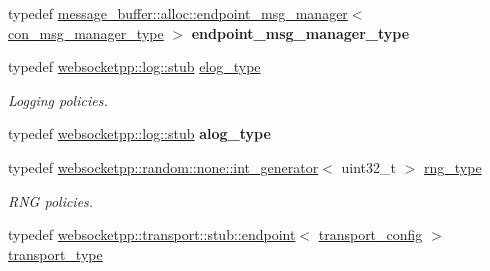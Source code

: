 \begin{DoxyCompactItemize}
\item 
typedef \hyperlink{classwebsocketpp_1_1message__buffer_1_1alloc_1_1endpoint__msg__manager}{message\+\_\+buffer\+::alloc\+::endpoint\+\_\+msg\+\_\+manager}$<$ \hyperlink{classwebsocketpp_1_1message__buffer_1_1alloc_1_1con__msg__manager}{con\+\_\+msg\+\_\+manager\+\_\+type} $>$ {\bfseries endpoint\+\_\+msg\+\_\+manager\+\_\+type}\hypertarget{structwebsocketpp_1_1config_1_1minimal__server_aeb6079297c7d7ceb1742178e00d11b34}{}\label{structwebsocketpp_1_1config_1_1minimal__server_aeb6079297c7d7ceb1742178e00d11b34}

\item 
typedef \hyperlink{classwebsocketpp_1_1log_1_1stub}{websocketpp\+::log\+::stub} \hyperlink{structwebsocketpp_1_1config_1_1minimal__server_ab8a516661fb2ddd3a3c377823b623c1a}{elog\+\_\+type}\hypertarget{structwebsocketpp_1_1config_1_1minimal__server_ab8a516661fb2ddd3a3c377823b623c1a}{}\label{structwebsocketpp_1_1config_1_1minimal__server_ab8a516661fb2ddd3a3c377823b623c1a}

\begin{DoxyCompactList}\small\item\em Logging policies. \end{DoxyCompactList}\item 
typedef \hyperlink{classwebsocketpp_1_1log_1_1stub}{websocketpp\+::log\+::stub} {\bfseries alog\+\_\+type}\hypertarget{structwebsocketpp_1_1config_1_1minimal__server_a9296068cfeabe4786e08691cd755f9b3}{}\label{structwebsocketpp_1_1config_1_1minimal__server_a9296068cfeabe4786e08691cd755f9b3}

\item 
typedef \hyperlink{classwebsocketpp_1_1random_1_1none_1_1int__generator}{websocketpp\+::random\+::none\+::int\+\_\+generator}$<$ uint32\+\_\+t $>$ \hyperlink{structwebsocketpp_1_1config_1_1minimal__server_a7f3520a016124fc86f907bcf934f74f2}{rng\+\_\+type}\hypertarget{structwebsocketpp_1_1config_1_1minimal__server_a7f3520a016124fc86f907bcf934f74f2}{}\label{structwebsocketpp_1_1config_1_1minimal__server_a7f3520a016124fc86f907bcf934f74f2}

\begin{DoxyCompactList}\small\item\em R\+NG policies. \end{DoxyCompactList}\item 
typedef \hyperlink{classwebsocketpp_1_1transport_1_1stub_1_1endpoint}{websocketpp\+::transport\+::stub\+::endpoint}$<$ \hyperlink{structwebsocketpp_1_1config_1_1minimal__server_1_1transport__config}{transport\+\_\+config} $>$ \hyperlink{structwebsocketpp_1_1config_1_1minimal__server_a6e5badb1b21e44416a801ed216a3c72e}{transport\+\_\+type}\hypertarget{structwebsocketpp_1_1config_1_1minimal__server_a6e5badb1b21e44416a801ed216a3c72e}{}\label{structwebsocketpp_1_1config_1_1minimal__server_a6e5badb1b21e44416a801ed216a3c72e}


\end{DoxyCompactItemize}
